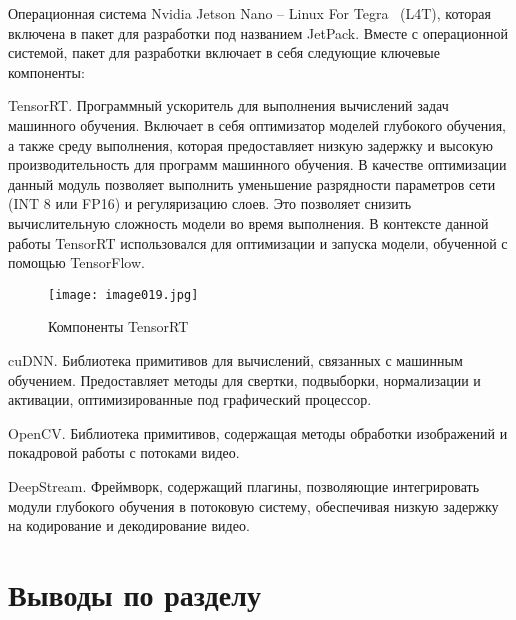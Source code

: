 Операционная система Nvidia Jetson Nano – Linux For Tegra ~(L4T), которая включена в пакет для разработки под названием JetPack. Вместе с операционной системой, пакет для разработки включает в себя следующие ключевые компоненты:

%
\begin{itemize*}
  \item TensorRT.
	Программный ускоритель для выполнения вычислений задач машинного обучения. Включает в себя оптимизатор моделей глубокого обучения, а также среду выполнения, которая предоставляет низкую задержку и высокую производительность для программ машинного обучения.
	В качестве оптимизации данный модуль позволяет выполнить уменьшение разрядности параметров сети (INT 8 или FP16) и регуляризацию слоев. Это позволяет снизить вычислительную сложность модели во время выполнения. 
	В контексте данной работы TensorRT использовался для оптимизации и запуска модели, обученной с помощью TensorFlow.
	\begin{figure}[htbp]
	\centering
	\texttt{[image: image019.jpg]}
	\caption{Компоненты TensorRT}%
	\label{fig:how-to-do-research}
	\end{figure}
  \item cuDNN.
	Библиотека примитивов для вычислений, связанных с машинным обучением. Предоставляет методы для свертки, подвыборки, нормализации и активации, оптимизированные под графический процессор.
  \item OpenCV.
	Библиотека примитивов, содержащая методы обработки изображений и покадровой работы с потоками видео.	
  \item DeepStream.
	Фреймворк, содержащий плагины, позволяющие интегрировать модули глубокого обучения в потоковую систему, обеспечивая низкую задержку на кодирование и декодирование видео.
\end{itemize*}
%

\section{Выводы по разделу}

